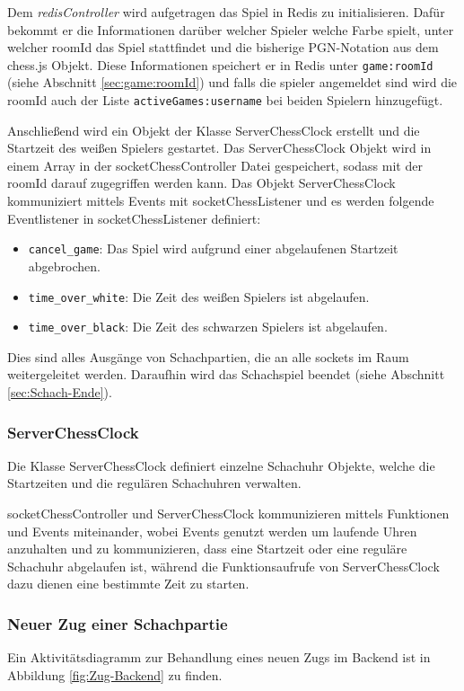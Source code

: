 Dem \textit{redisController} wird aufgetragen das Spiel in Redis zu initialisieren. Dafür bekommt er die Informationen darüber welcher Spieler welche Farbe spielt, unter welcher roomId das Spiel stattfindet und die bisherige PGN-Notation aus dem chess.js Objekt. Diese Informationen speichert er in Redis unter \verb|game:roomId| (siehe Abschnitt \ref{sec:game:roomId}) und falls die spieler angemeldet sind wird die roomId auch der Liste \verb|activeGames:username| bei beiden Spielern hinzugefügt.

Anschließend wird ein Objekt der Klasse ServerChessClock erstellt und die Startzeit des weißen Spielers gestartet. Das ServerChessClock Objekt wird in einem Array in der socketChessController Datei gespeichert, sodass mit der roomId darauf zugegriffen werden kann. Das Objekt ServerChessClock kommuniziert mittels Events mit socketChessListener und es werden folgende Eventlistener in socketChessListener definiert:
\begin{itemize}
\item \verb|cancel_game|: Das Spiel wird aufgrund einer abgelaufenen Startzeit abgebrochen.
\item \verb|time_over_white|:  Die Zeit des weißen Spielers ist abgelaufen.
\item \verb|time_over_black|:  Die Zeit des schwarzen Spielers ist abgelaufen.
\end{itemize}

Dies sind alles Ausgänge von Schachpartien, die an alle sockets im Raum weitergeleitet werden. Daraufhin wird das Schachspiel beendet (siehe Abschnitt \ref{sec:Schach-Ende}).

\subsubsection{ServerChessClock}
Die Klasse ServerChessClock definiert einzelne Schachuhr Objekte, welche die Startzeiten und die regulären Schachuhren verwalten.

socketChessController und ServerChessClock kommunizieren mittels Funktionen und Events miteinander, wobei Events genutzt werden um laufende Uhren anzuhalten und zu kommunizieren, dass eine Startzeit oder eine reguläre Schachuhr abgelaufen ist, während die Funktionsaufrufe von ServerChessClock dazu dienen eine bestimmte Zeit zu starten.

\subsubsection{Neuer Zug einer Schachpartie}
Ein Aktivitätsdiagramm zur Behandlung eines neuen Zugs im Backend ist in Abbildung \ref{fig:Zug-Backend} zu finden. 


